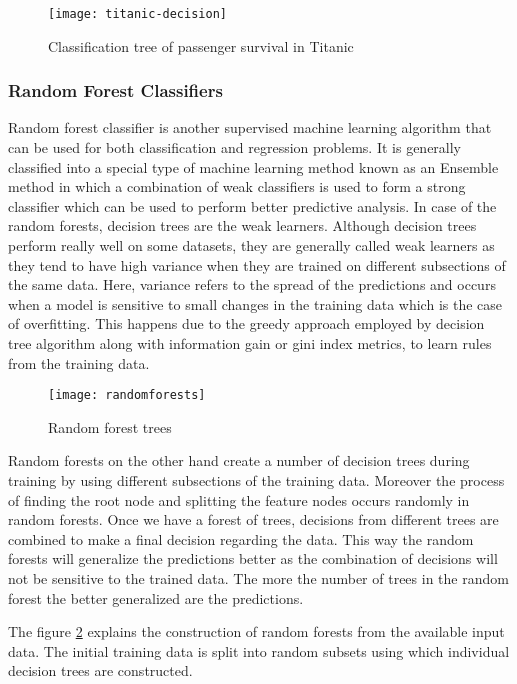 \documentclass[11pt,openright]{report}
\begin{document}
  \begin{figure}
	\centering
	\texttt{[image: titanic-decision]}
	\caption{Classification tree of passenger survival in Titanic}
	\label{fig:classification_tree_titanic}
\end{figure} 
\subsubsection {Random Forest Classifiers}
Random forest classifier is another supervised machine learning algorithm that can be used for both classification and regression problems. It is generally classified into a special type of machine learning method known as an Ensemble method in which a combination of weak classifiers is used to form a strong classifier which can be used to perform better predictive analysis. In case of the random forests, decision trees are the weak learners.  Although decision trees perform really well on some datasets, they are generally called weak learners as they tend to have high variance when they are trained on different subsections of the same data. Here, variance refers to the spread of the predictions and occurs when a model is sensitive to small changes in the training data which is the case of overfitting. This happens due to the greedy approach employed by decision tree algorithm along with information gain or gini index metrics, to learn rules from the training data.
  \begin{figure}[!htbp]
	\centering
	\texttt{[image: randomforests]}
	\caption{Random forest trees}
	\label{fig:random_forest_trees}
\end{figure} 


Random forests on the other hand create a number of decision trees during training by using different subsections of the training data.  Moreover the process of finding the root node and splitting the feature nodes occurs randomly in random forests. Once we have a forest of trees, decisions from different trees are combined to make a final decision regarding the data. This way the random forests will generalize the predictions better as the combination of decisions will not be sensitive to the trained data. The more the number of trees in the random forest the better generalized are the predictions.

The figure \ref{fig:random_forest_trees} explains the construction of random forests from the available input data. The initial training data is split into random subsets using which individual decision trees are constructed.
\end{document}
